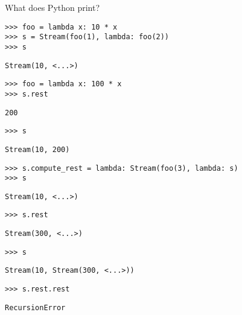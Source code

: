 \question What does Python print?

\begin{lstlisting}
>>> foo = lambda x: 10 * x
>>> s = Stream(foo(1), lambda: foo(2))
>>> s
\end{lstlisting}
\begin{solution}
\begin{lstlisting}
Stream(10, <...>)
\end{lstlisting}
\end{solution}

\begin{lstlisting}
>>> foo = lambda x: 100 * x
>>> s.rest
\end{lstlisting}
\begin{solution}
\begin{lstlisting}
200
\end{lstlisting}
\end{solution}

\begin{lstlisting}
>>> s
\end{lstlisting}
\begin{solution}
\begin{lstlisting}
Stream(10, 200)
\end{lstlisting}
\end{solution}

\begin{lstlisting}
>>> s.compute_rest = lambda: Stream(foo(3), lambda: s)
>>> s
\end{lstlisting}
\begin{solution}
\begin{lstlisting}
Stream(10, <...>)
\end{lstlisting}
\end{solution}

\begin{lstlisting}
>>> s.rest
\end{lstlisting}
\begin{solution}
\begin{lstlisting}
Stream(300, <...>)
\end{lstlisting}
\end{solution}

\begin{lstlisting}
>>> s
\end{lstlisting}
\begin{solution}
\begin{lstlisting}
Stream(10, Stream(300, <...>))
\end{lstlisting}
\end{solution}

\begin{lstlisting}
>>> s.rest.rest
\end{lstlisting}
\begin{solution}
\begin{lstlisting}
RecursionError
\end{lstlisting}
\end{solution}
